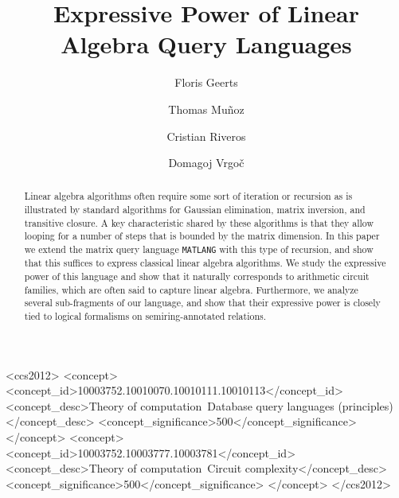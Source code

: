 \documentclass[sigconf]{acmart}
\newcommand{\lang}{\texttt{MATLANG}\xspace}
\begin{document}
\fancyhead{} 
\title{Expressive Power of Linear Algebra Query Languages}
\author{Floris Geerts}


\author{Thomas Mu{\~{n}}oz}

\author{Cristian Riveros}

\author{Domagoj Vrgo\v{c}}


\begin{abstract}
Linear algebra algorithms often require some sort of iteration or recursion as is illustrated by standard algorithms for Gaussian elimination, matrix inversion, and transitive closure. A key characteristic shared by these 
algorithms is that they allow looping for a number of steps that is bounded by the matrix dimension. 
In this paper we extend the matrix query language \lang with this type of recursion, and show that this suffices to express  classical linear algebra algorithms. We study the expressive power of this language and show that it naturally corresponds to arithmetic circuit families, which are often said to capture linear algebra. Furthermore, we analyze several sub-fragments of our language, and show that their expressive power is closely tied to logical formalisms on semiring-annotated relations.
\end{abstract}

\begin{CCSXML}
<ccs2012>
<concept>
<concept_id>10003752.10010070.10010111.10010113</concept_id>
<concept_desc>Theory of computation~Database query languages (principles)</concept_desc>
<concept_significance>500</concept_significance>
</concept>
<concept>
<concept_id>10003752.10003777.10003781</concept_id>
<concept_desc>Theory of computation~Circuit complexity</concept_desc>
<concept_significance>500</concept_significance>
</concept>
</ccs2012>
\end{CCSXML}
\end{document}
